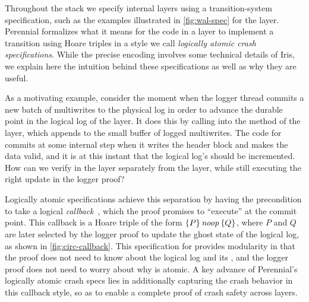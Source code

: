 Throughout the \txn stack we specify internal layers using a transition-system
specification, such as the examples illustrated in \cref{fig:wal-spec} for
the  layer. Perennial formalizes what it means for the code in a layer to
implement a transition using Hoare triples in a style we call
\emph{logically atomic crash specifications}. While the precise encoding
involves some technical details of Iris, we explain here the intuition behind these
specifications as well as why they are useful.

As a motivating example, consider the moment when the logger thread commits a
new batch of multiwrites to the physical log in order to advance the durable
point  in the logical log of the  layer. It does this by calling into the
 method of the  layer, which appends to the small
buffer of logged multiwrites. The code for  commits at some internal
step when it writes the header block and makes the data valid, and it is at this
instant that the logical log's  should be incremented.
How can we verify  in the  layer separately from the  layer,
while still executing the right update in the logger proof?

Logically atomic specifications achieve this separation by having the precondition to 
take a logical \emph{callback}~\cite{jacobs:logatom}, which the proof promises to ``execute'' at the commit point.
This callback is a Hoare triple of the form $\hoare{P}{\SKIP}{Q}$, where $P$ and $Q$ are later selected
by the logger proof to update the  ghost state of the logical log, as shown in \cref{fig:circ-callback}.
This
specification for  provides modularity in that the  proof
does not need to know about the logical log and its , and the logger
proof does not need to worry about why  is atomic.  A key
advance of Perennial's logically atomic crash specs lies in additionally capturing the
crash behavior in this callback style, so as to enable a complete
proof of crash safety across layers.

